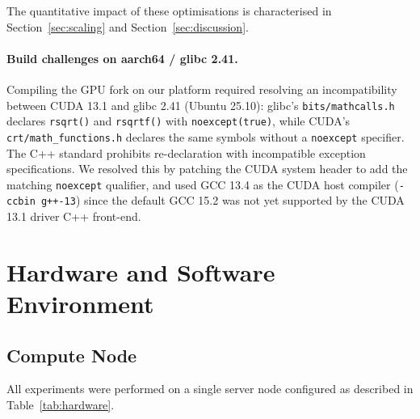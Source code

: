 \documentclass[a4paper,12pt]{article}
\begin{document}
\noindent The quantitative impact of these optimisations is characterised in
Section~\ref{sec:scaling} and Section~\ref{sec:discussion}.

\paragraph{Build challenges on aarch64 / glibc 2.41.}
Compiling the GPU fork on our platform required resolving an incompatibility
between CUDA 13.1 and glibc 2.41 (Ubuntu 25.10): glibc's
\texttt{bits/mathcalls.h} declares \texttt{rsqrt()} and \texttt{rsqrtf()} with
\texttt{noexcept(true)}, while CUDA's \texttt{crt/math\_functions.h} declares
the same symbols without a \texttt{noexcept} specifier.  The C++ standard
prohibits re-declaration with incompatible exception specifications.  We
resolved this by patching the CUDA system header to add the matching
\texttt{noexcept} qualifier, and used GCC 13.4 as the CUDA host compiler
(\texttt{-ccbin~g++-13}) since the default GCC 15.2 was not yet supported by
the CUDA 13.1 driver C++ front-end.

\section{Hardware and Software Environment}
\label{sec:hardware}

\subsection{Compute Node}

All experiments were performed on a single server node configured as described
in Table~\ref{tab:hardware}.
\end{document}
